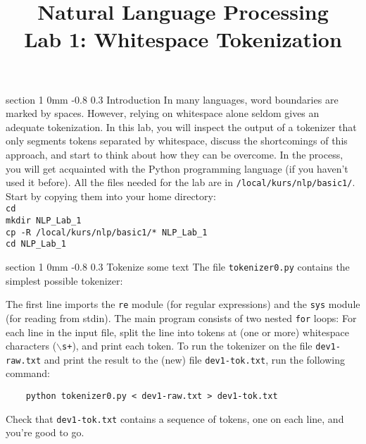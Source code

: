 \documentclass[11pt]{article}
\title{{\LARGE Natural Language Processing}\\[1.5mm]{\large Lab 1: Whitespace Tokenization}}
\author{}
\date{} %
\makeatletter
\newcommand{\newsec}[2]{\section{#1}\label{sec:#2}\noindent}
\renewcommand{\section}{\@startsection
{section}%
{1}%
{0mm}%
{-0.8\baselineskip}%
{0.3\baselineskip}%
{\bfseries\large}}%
\makeatother
\begin{document}
 

\maketitle
\vspace{-2mm} \newsec{Introduction}{intro}%
In many languages, word boundaries are marked by spaces. However,
relying on whitespace alone seldom gives an adequate tokenization. In
this lab, you will inspect the output of a tokenizer that only
segments tokens separated by whitespace, discuss the shortcomings of
this approach, and start to think about how they can be overcome. In
the process, you will get acquainted with the Python programming
language (if you haven't used it
before). %
All the files needed for
the lab are in {\tt /local/kurs/nlp/basic1/}. Start by copying
them into your home directory:\\
{\tt cd}\\
{\tt mkdir NLP\_Lab\_1}\\
{\tt cp -R /local/kurs/nlp/basic1/* NLP\_Lab\_1}\\
{\tt cd NLP\_Lab\_1}

\newsec{Tokenize some text}{tokenize}%
The file {\tt tokenizer0.py} contains the simplest possible tokenizer:
\begin{center}
\fbox{

}
\end{center}
The first line imports the {\tt re} module (for regular expressions)
and the {\tt sys} module (for reading from stdin). The main program
consists of two nested {\tt for} loops: For each line in the input
file, split the line into tokens at (one or more) whitespace
characters ({\tt {$\backslash$}s+}), and print each token.  To run the
tokenizer on the file {\tt dev1-raw.txt} and print the result to the
(new) file {\tt dev1-tok.txt}, run the following command:
\begin{verbatim}
    python tokenizer0.py < dev1-raw.txt > dev1-tok.txt
\end{verbatim}
Check that {\tt dev1-tok.txt} contains a sequence of tokens, one on
each line, and you're good to go.
\end{document}
